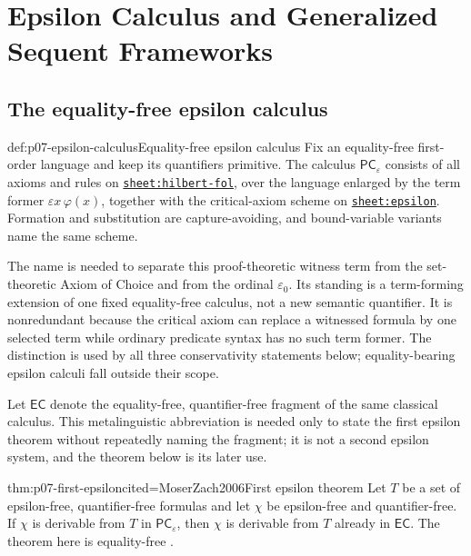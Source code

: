 
\chapter{Epsilon Calculus and Generalized Sequent Frameworks}
\label{sec:p07-structural-extensions}

\section{The equality-free epsilon calculus}
\label{sec:p07-epsilon-calculus}

\begin{hbdefinition}{def:p07-epsilon-calculus}{Equality-free epsilon calculus}
Fix an equality-free first-order language and keep its quantifiers primitive.
The calculus \(\mathsf{PC}_{\varepsilon}\) consists of all axioms and rules on
\hyperref[sheet:hilbert-fol]{\texttt{sheet:hilbert-fol}}, over the language
enlarged by the term former
\(\varepsilon x\,\varphi(x)\), together with the critical-axiom scheme on
\hyperref[sheet:epsilon]{\texttt{sheet:epsilon}}.  Formation and substitution
are capture-avoiding, and bound-variable variants name the same scheme.

The name is needed to separate this proof-theoretic witness term from the
set-theoretic Axiom of Choice and from the ordinal \(\varepsilon_0\).  Its
standing is a term-forming extension of one fixed equality-free calculus, not
a new semantic quantifier.  It is nonredundant because the critical axiom can
replace a witnessed formula by one selected term while ordinary predicate
syntax has no such term former.  The distinction is used by all three
conservativity statements below; equality-bearing epsilon calculi fall
outside their scope.
\end{hbdefinition}

Let \(\mathsf{EC}\) denote the equality-free, quantifier-free fragment of the
same classical calculus.  This metalinguistic abbreviation is needed only to
state the first epsilon theorem without repeatedly naming the fragment; it is
not a second epsilon system, and the theorem below is its later use.

\begin{hbtheorem}{thm:p07-first-epsilon}{cited=MoserZach2006}{First epsilon theorem}
Let \(T\) be a set of epsilon-free, quantifier-free formulas and let
\(\chi\) be epsilon-free and quantifier-free.  If \(\chi\) is derivable from \(T\)
in \(\mathsf{PC}_{\varepsilon}\), then \(\chi\) is derivable from \(T\) already
in \(\mathsf{EC}\).  The theorem here is equality-free
\cite{HilbertBernays1939,Buss1998,MoserZach2006}.
\end{hbtheorem}

